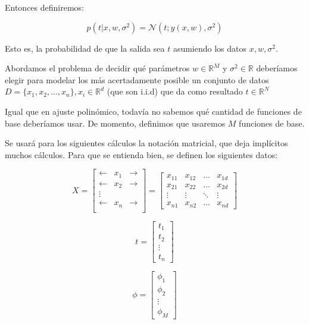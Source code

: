 \documentclass[a4paper,10pt]{article}
\begin{document}
Entonces definiremos:

\begin{equation*}
p(t | x, w, \sigma^2) = \mathcal{N}(t; y(x,w), \sigma^2)
\end{equation*}

Esto es, la probabilidad de que la salida sea $t$ asumiendo los datos $x, w, \sigma^2$.

Abordamos el problema de decidir qué parámetros $w \in \mathbb{R}^M$ y $\sigma^2 \in \mathbb{R}$ deberíamos elegir para modelar los más acertadamente posible un conjunto de datos $D = \{x_1, x_2, \dots, x_n\}, x_i \in \mathbb{R}^d$ (que son i.i.d)
que da como resultado $t \in \mathbb{R}^N$

Igual que en ajuste polinómico, todavía no sabemos qué cantidad de funciones de base deberíamos usar. De momento, definimos que usaremos $M$ funciones de base.

Se usará para los siguientes cálculos la notación matricial, que deja implícitos muchos cálculos. Para que se entienda bien, se definen los siguientes datos:


\begin{equation*}
X =
\begin{bmatrix}
\leftarrow & x_1 & \rightarrow \\
\leftarrow & x_2 & \rightarrow \\
\vdots \\
\leftarrow & x_n & \rightarrow \\
\end{bmatrix}
=
\begin{bmatrix}
x_{11} & x_{12} & \dots & x_{1d} \\
x_{21} & x_{22} & \dots & x_{2d} \\
\vdots & \vdots & \ddots & \vdots \\
x_{n1} & x_{n2} & \dots & x_{nd}
\end{bmatrix}
\end{equation*}



\begin{equation*}
t =
\begin{bmatrix}
t_1 \\
t_2 \\
\vdots \\
t_n
\end{bmatrix}
\end{equation*}

\begin{equation*}
\phi =
\begin{bmatrix}
\phi_1 \\
\phi_2 \\
\vdots \\
\phi_M
\end{bmatrix}
\end{equation*}
\end{document}
